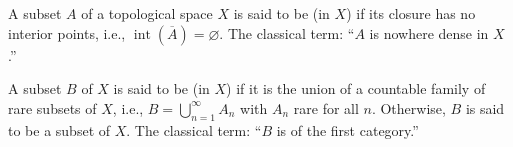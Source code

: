 A subset $A$ of a topological space $X$ is said to be  (in $X$) if its closure has no interior points, i.e., $\operatorname{int}(\overline{A}) = \varnothing$. {The classical term: ``$A$ is nowhere dense in $X$.''}

A subset $B$ of $X$ is said to be  (in $X$) if it is the union of a countable family of rare subsets of $X$, i.e., $B = \bigcup_{n=1}^{\infty} A_n$ with $A_n$ rare for all $n$. Otherwise, $B$ is said to be a  subset of $X$. {The classical term: ``$B$ is of the first category.''}
